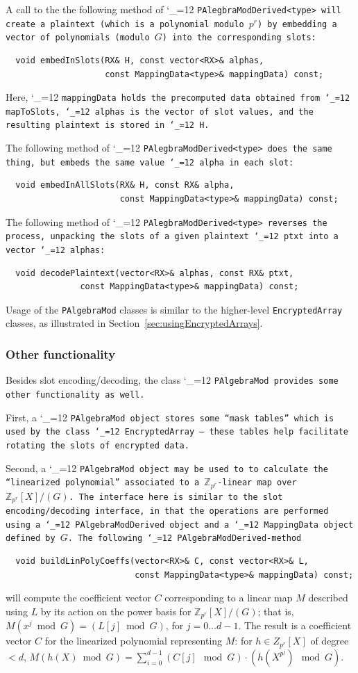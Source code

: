 \documentclass[14pt]{extarticle}
\newcommand{\secref}[1]{Section~\protect\ref{sec:#1}}
\newcommand{\Z}{\mathbb{Z}}
\def\class{%
\begingroup\catcode`\_=12\relax
\classwitharg}
\def\classwitharg#1{\tt #1\endgroup}
\begin{document}
A call to the the following method of \class{PAlegbraModDerived<type>}
will create a plaintext (which is a polynomial modulo $p^r$) 
by embedding a vector of polynomials (modulo $G$) into the corresponding
slots:
\begin{verbatim}
  void embedInSlots(RX& H, const vector<RX>& alphas, 
                    const MappingData<type>& mappingData) const;
\end{verbatim}
Here, \class{mappingData} holds the precomputed data obtained
from \class{mapToSlots}, \class{alphas} is the
vector of slot values, and the resulting plaintext
is stored in \class{H}.

The following method of \class{PAlegbraModDerived<type>} does the
same thing, but embeds the same value \class{alpha} in each slot:
\begin{verbatim}
  void embedInAllSlots(RX& H, const RX& alpha, 
                       const MappingData<type>& mappingData) const;
\end{verbatim}

The following method of \class{PAlegbraModDerived<type>} reverses
the process, unpacking the slots of a given plaintext \class{ptxt}
into a vector \class{alphas}:
\begin{verbatim}
  void decodePlaintext(vector<RX>& alphas, const RX& ptxt,
		       const MappingData<type>& mappingData) const;
\end{verbatim}

Usage of the \texttt{PAlgebraMod} classes is similar to the
higher-level \texttt{EncryptedArray} classes, as illustrated in
\secref{usingEncryptedArrays}.

\subsubsection*{Other functionality}
Besides slot encoding/decoding, the class \class{PAlgebraMod} provides
some other functionality as well.

First, a  \class{PAlgebraMod} object stores some ``mask tables''
which is used by the class \class{EncryptedArray} --- these
tables help facilitate rotating the slots of encrypted data.

Second, a \class{PAlgebraMod} object may be used to
to calculate the ``linearized polynomial'' associated
to a $\Z_{p^r}$-linear map over $\Z_{p^r}[X]/(G)$.
The interface here is similar to the slot encoding/decoding
interface, in that the operations are performed using a
\class{PAlgebraModDerived} object and a \class{MappingData}
object defined by $G$.
The following \class{PAlgebraModDerived}-method
\begin{verbatim}
  void buildLinPolyCoeffs(vector<RX>& C, const vector<RX>& L,
                          const MappingData<type>& mappingData) const;
\end{verbatim}
will compute the coefficient vector $C$ corresponding to 
a linear map $M$ described using $L$ by its action on the
power basis for $\Z_{p^r}[X]/(G)$;
that is,  $M(x^j \bmod G) = (L[j] \bmod G)$,
  for $j = 0 \ldots d-1$.  
The result is a coefficient vector $C$ for the linearized
polynomial representing $M$:   for $h \in Z_{p^r}[X]$ of degree $< d$,  
$M(h(X) \bmod G) = \sum_{i=0}^{d-1} (C[j] \mod G) \cdot (h(X^{p^j}) \mod G)$.
\end{document}
